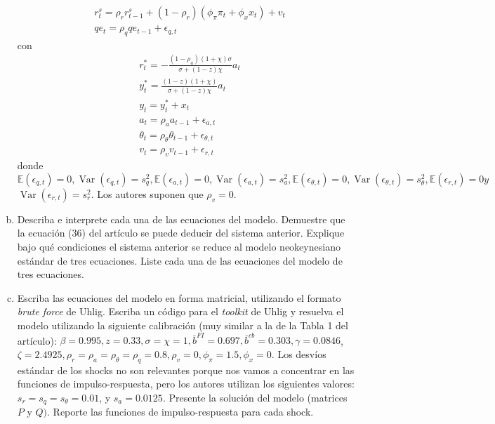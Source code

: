 \documentclass[10pt,a4paper]{article}
\begin{document}
\begin{mdframed}
\begin{enumerate}[(a)]
\begin{equation*}
\begin{aligned}
				       & r_{t}^{s}=\rho_{r} r_{t-1}^{s}+\left(1-\rho_{r}\right)\left(\phi_{\pi} \pi_{t}+\phi_{x} x_{t}\right)+v_{t}                                                                                                                                         \\
				       & q e_{t}=\rho_{q} q e_{t-1}+\epsilon_{q, t}
			      \end{aligned}
		      \end{equation*}
		      con
		      \begin{equation*}
			      \begin{aligned}
				       & r_{t}^{*}=-\frac{\left(1-\rho_{a}\right)(1+\chi) \sigma}{\sigma+(1-z) \chi} a_{t} \\
				       & y_{t}^{*}=\frac{(1-z)(1+\chi)}{\sigma+(1-z) \chi} a_{t}                           \\
				       & y_{t}=y_{t}^{*}+x_{t}                                                             \\
				       & a_{t}=\rho_{a} a_{t-1}+\epsilon_{a, t}                                            \\
				       & \theta_{t}=\rho_{\theta} \theta_{t-1}+\epsilon_{\theta, t}                        \\
				       & v_{t}=\rho_{v} v_{t-1}+\epsilon_{r, t}
			      \end{aligned}
		      \end{equation*}
		      donde $\mathbb{E}\left(\epsilon_{q, t}\right)=0, \operatorname{Var}\left(\epsilon_{q, t}\right)=s_{q}^{2}, \mathbb{E}\left(\epsilon_{a, t}\right)=0, \operatorname{Var}\left(\epsilon_{a, t}\right)=s_{a}^{2}, \mathbb{E}\left(\epsilon_{\theta, t}\right)=0, \operatorname{Var}\left(\epsilon_{\theta, t}\right)=s_{\theta}^{2}, \mathbb{E}\left(\epsilon_{r, t}\right)=0 y$ $\operatorname{Var}\left(\epsilon_{r, t}\right)=s_{r}^{2}$. Los autores suponen que $\rho_{v}=0$.
		\item Describa e interprete cada una de las ecuaciones del modelo. Demuestre que la ecuación (36) del artículo se puede deducir del sistema anterior. Explique bajo qué condiciones el sistema anterior se reduce al modelo neokeynesiano estándar de tres ecuaciones. Liste cada una de las ecuaciones del modelo de tres ecuaciones.
		\item Escriba las ecuaciones del modelo en forma matricial, utilizando el formato \emph{brute force} de Uhlig. Escriba un código para el \emph{toolkit} de Uhlig y resuelva el modelo utilizando la siguiente calibración (muy similar a la de la Tabla 1 del artículo): $\beta=0.995, z=0.33, \sigma=\chi=1, \bar{b}^{F I}=0.697, \bar{b}^{c b}=0.303, \gamma=0.0846$, $\zeta=2.4925, \rho_{r}=\rho_{a}=\rho_{\theta}=\rho_{q}=0.8, \rho_{v}=0, \phi_{\pi}=1.5, \phi_{x}=0$. Los desvíos estándar de los shocks no son relevantes porque nos vamos a concentrar en las funciones de impulso-respuesta, pero los autores utilizan los siguientes valores: $s_{r}=s_{q}=s_{\theta}=0.01$, y $s_{a}=0.0125$. Presente la solución del modelo (matrices $P$ y $Q)$. Reporte las funciones de impulso-respuesta para cada shock.

\end{enumerate}
\end{mdframed}
\end{document}
